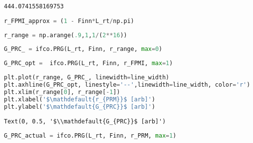 \begin{spacing}{1}\begin{lstlisting}
444.0741558169753
\end{lstlisting}\end{spacing}

\begin{spacing}{1}\begin{lstlisting}[frame=single, language=Python]
r_FPMI_approx = (1 - Finn*L_rt/np.pi)
\end{lstlisting}\end{spacing}

\begin{spacing}{1}\begin{lstlisting}[frame=single, language=Python]
r_range = np.arange(.9,1,1/(2**16))
\end{lstlisting}\end{spacing}

\begin{spacing}{1}\begin{lstlisting}[frame=single, language=Python]
G_PRC_ = ifco.PRG(L_rt, Finn, r_range, max=0) 
\end{lstlisting}\end{spacing}

\begin{spacing}{1}\begin{lstlisting}[frame=single, language=Python]
G_PRC_opt =  ifco.PRG(L_rt, Finn, r_FPMI, max=1)
\end{lstlisting}\end{spacing}

\begin{spacing}{1}\begin{lstlisting}[frame=single, language=Python]
plt.plot(r_range, G_PRC_, linewidth=line_width)
plt.axhline(G_PRC_opt, linestyle='--',linewidth=line_width, color='r')
plt.xlim(r_range[0], r_range[-1])
plt.xlabel('$\mathdefault{r_{PRM}}$ [arb]')
plt.ylabel('$\mathdefault{G_{PRC}}$ [arb]')
\end{lstlisting}\end{spacing}

\begin{spacing}{1}\begin{lstlisting}
Text(0, 0.5, '$\\mathdefault{G_{PRC}}$ [arb]')
\end{lstlisting}\end{spacing}

\begin{spacing}{1}\begin{lstlisting}[frame=single, language=Python]
G_PRC_actual = ifco.PRG(L_rt, Finn, r_PRM, max=1)
\end{lstlisting}\end{spacing}

